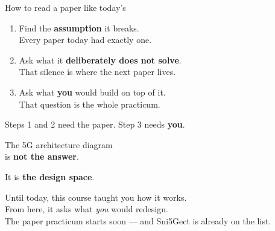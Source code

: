 \begin{frame}{How to read a paper like today's}
  \vspace{0.8em}
  \large
  \begin{enumerate}\itemsep14pt
    \item Find the \textbf{assumption} it breaks.\\
      {\small\textcolor{softgray}{Every paper today had exactly one.}}
    \item Ask what it \textbf{deliberately does not solve}.\\
      {\small\textcolor{softgray}{That silence is where the next paper lives.}}
    \item Ask what \textbf{you} would build on top of it.\\
      {\small\textcolor{softgray}{That question is the whole practicum.}}
  \end{enumerate}

  \vspace{0.7em}
  \normalsize
  Steps 1 and 2 need the paper. Step 3 needs \textbf{you}.
\end{frame}

\begin{frame}[plain]
  \vspace{2.2em}
  \centering
  {\huge The 5G architecture diagram\\[0.35em] is \textbf{not the answer}.\par}

  \vspace{1.1em}
  {\huge It is \textcolor{coreorange}{\textbf{the design space}}.\par}

  \vspace{2.2em}
  \normalsize\textcolor{softgray}{%
    Until today, this course taught you how it works.\\[0.25em]
    From here, it asks what \textit{you} would redesign.\\[0.25em]
    The paper practicum starts soon --- and Sni5Gect is already on the list.}
\end{frame}
